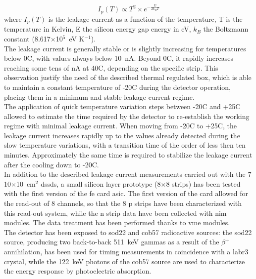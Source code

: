 \begin{equation}
I_p(T) \propto T^2 \times e^{-\frac{E}{2k_{B}T}}
\label{chap3::eq::leakCurrentTemp}
\end{equation}  
where $I_{p}(T)$ is the leakage current as a function of the temperature, T is the temperature in Kelvin, E the silicon energy gap energy in eV, $k_B$ the Boltzmann constant (8.617$\times$10$^{5}$~eV K$^{-1}$).\\

The leakage current is generally stable or is slightly increasing for temperatures below 0\textdegree{}C, with values always below 10~nA. Beyond 0\textdegree{}C, it rapidly increases reaching some tens of nA at 40\textdegree{}C, depending on the specific strip. This observation justify the need of the described thermal regulated box, which is able to maintain a constant temperature of -20\textdegree{}C during the detector operation, placing them in a minimum and stable leakage current regime.\\
The application of quick temperature variation steps between -20\textdegree{}C and +25\textdegree{}C allowed to estimate the time required by the detector to re-establish the working regime with minimal leakage current. When moving from -20\textdegree{}C to +25\textdegree{}C, the leakage current increases rapidly up to the values already detected during the slow temperature variations, with a transition time of the order of less then ten minutes. Approximately the same time is required to stabilize the leakage current after the cooling down to -20\textdegree{}C.\\
In addition to the described leakage current measurements carried out with the 7 10$\times$10~cm$^{2}$ \glspl{dssd}, a small silicon layer prototype (8$\times$8 strips) has been tested with the first version of the \gls{fe} card \gls{asic}. The first version of the card allowed for the read-out of 8 channels, so that the 8 p strips have been characterized with this read-out system, while the n strip data have been collected with \gls{nim} modules. The data treatment has been performed thanks to \gls{vme} modules.\\
The detector has been exposed to \gls{sod22} and \gls{cob57} radioactive sources: the \gls{sod22} source, producing two back-to-back 511~keV gammas as a result of the $\beta^{+}$ annihilation, has been used for timing measurements in coincidence with a \gls{labr3} crystal, while the 122~keV photons of the \gls{cob57} source are used to characterize the energy response by photoelectric absorption.\\
